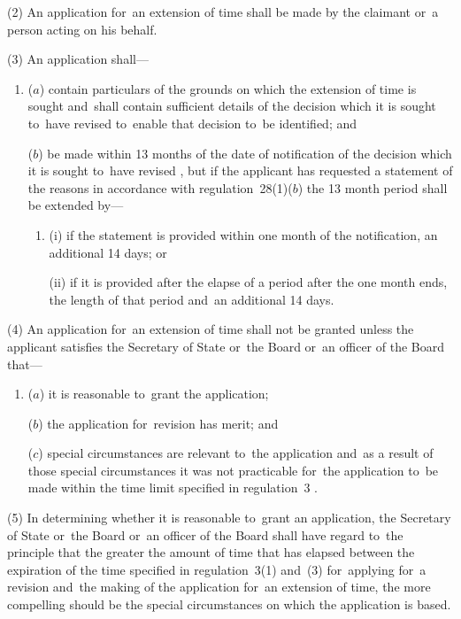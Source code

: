 \documentclass[12pt,a4paper]{article}
\begin{document}
\pagebreak[3]

(2) An application for~an extension of time shall be made by 
%
the claimant or~a person acting on his behalf.

(3) An application shall—
\begin{enumerate}\item[]
($a$) contain particulars of the grounds on which the extension of time is sought and~shall contain sufficient details of the decision which it is sought to~have revised to~enable that decision to~be identified; and

($b$) be made within 13 months of the date of notification of the decision which it is sought to~have revised%
, but if the applicant has requested a statement of the reasons in accordance with regulation~28(1)($b$)  the 13 month period shall be extended by—
\begin{enumerate}\item[]
(i) if the statement is provided within one month of the notification, an additional 14 days; or

(ii) if it is provided after the elapse of a period after the one month ends, the length of that period and~an additional 14 days.
\end{enumerate}  %
\end{enumerate}

(4) An application for~an extension of time shall not be granted unless the applicant satisfies the Secretary of State%
% 
or~the Board or~an officer of the Board  %
that—
\begin{enumerate}\item[]
($a$) it is reasonable to~grant the application;

($b$) the application for~revision has merit; and

($c$) special circumstances are relevant to~the application and~as a result of those special circumstances it was not practicable for~the application to~be made within the time limit specified in regulation~3%
%
.
\end{enumerate}

(5) In determining whether it is reasonable to~grant an application, the Secretary of State%
% 
or~the Board or~an officer of the Board  %
shall have regard to~the principle that the greater the amount of time that has elapsed between the expiration of the time specified in regulation~3(1) and~(3) 
%
for~applying for~a revision and~the making of the application for~an extension of time, the more compelling should be the special circumstances on which the application is based.
\end{document}
